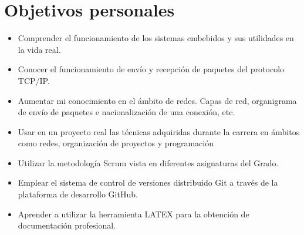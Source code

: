 \section{Objetivos personales}\label{sec:OPersonales}
\begin{itemize}
	\item Comprender el funcionamiento de los sistemas embebidos y sus utilidades en la vida real.
	\item Conocer el funcionamiento de envío y recepción de paquetes del protocolo TCP/IP.
	\item Aumentar mi conocimiento en el ámbito de redes. Capas de red, organigrama de envío de paquetes e nacionalización de una conexión, etc.
	\item Usar en un proyecto real las técnicas adquiridas durante la carrera en ámbitos como redes, organización de proyectos y programación
	\item Utilizar la metodología Scrum vista en diferentes asignaturas del Grado.
	\item Emplear el sistema de control de versiones distribuido Git a través de la plataforma de desarrollo GitHub.
	\item Aprender a utilizar la herramienta LATEX para la obtención de documentación profesional.
\end{itemize}		

		